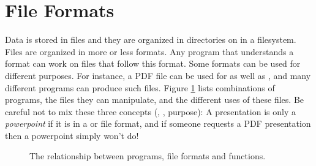 \section{File Formats}

Data is stored in files and they are organized in directories on in a filesystem. Files are organized in more or less  formats. Any program that understands a format can work on files that follow this format. Some formats can be used for different purposes. For instance, a PDF file can be used for  as well as , and many different programs can produce such files. Figure \ref{fig:bg:fileformats} lists combinations of programs, the files they can manipulate, and the different uses of these files. Be careful not to mix these three concepts (, , purpose): A presentation is only a \textsl{powerpoint} if it is in a  or  file format, and if someone requests a PDF presentation then a powerpoint simply won't do!

\begin{figure}[tbp]
  
  \caption{The relationship between programs, file formats and functions.}
  \label{fig:bg:fileformats}
\end{figure}

